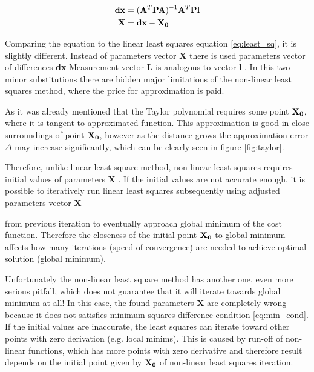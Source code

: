 \documentclass[a4paper,12pt]{article}
\newcommand{\ematr}[1]{
{\bf #1}
}
\newcommand{\evect}[1]{
{\bf #1}
}
\begin{document}
\begin{equation}
\begin{split}
\label{eq:non_least_sq}
\evect{dx} &= (\ematr{A}^{T} \ematr{P} \ematr{A})^{-1} \ematr{A}^{T} \ematr{P} \ematr{l} \\
\evect{X} &=  {\evect{dx} -  \evect{X_{0}}} \\
\end{split}
\end{equation}


Comparing the equation to the linear least squares equation \eqref{eq:least_sq},
 it is slightly different. Instead of parameters vector \evect{X} there is used 
parameters vector of differences \evect{dx} Measurement vector \evect{L} is analogous to vector \evect{l}. In this two minor 
substitutions there are hidden major limitations of the non-linear least squares method, 
where the price for approximation is paid. 

As it was already mentioned that the Taylor polynomial requires some point $\evect{X_{0}}$, where it is tangent to 
approximated function.
This approximation is good in close surroundings of point $\evect{X_{0}}$, however as the distance 
grows the approximation error $\Delta$ may increase significantly, which can be clearly seen in figure \ref{fig:taylor}.

Therefore, unlike linear least square method, non-linear least squares requires initial 
values of parameters \evect{X}. If the initial values are not accurate 
enough, it is possible to iteratively run linear least squares subsequently using adjusted parameters vector \evect{X}
from previous iteration to eventually approach global minimum of the cost function. 
Therefore the closeness of the initial point $\evect{X_{0}}$ to global minimum affects how many iterations (speed of convergence)
are needed to achieve optimal solution (global minimum).

Unfortunately the non-linear least square method has another one, even more serious pitfall, which 
does not guarantee that it will iterate towards global minimum at all!
In this case, the found parameters \evect{X} are completely wrong because 
it does not satisfies minimum squares difference condition \eqref{eq:min_cond}. If the initial values are 
inaccurate, the least squares can iterate toward other points with zero derivation (e.g. local minims).  
This is caused by run-off of non-linear functions, which has more points with zero derivative
and therefore result depends on the initial point given by $\evect{X_{0}}$  of non-linear least squares iteration.
\end{document}
